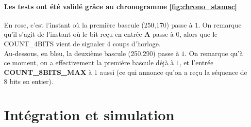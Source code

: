 \documentclass[a4paper]{article} %
\begin{document}
\begin{tcolorbox}[colframe=Monokaimagenta,colback=white]
\begin{figure}[H]
\label{fig:graphe_etat}
\end{figure}


\paragraph{Les tests ont été validé grâce au chronogramme \ref{fig:chrono_stamac}}
En rose, c'est l'instant où la première bascule (250,170) passe à $1$. On remarque qu'il s'agit de l'instant où le bit reçu en entrée \textbf{A} passe à $0$, alors que le COUNT\_4BITS vient de signaler 4 coups d'horloge.\\
Au-dessous, en bleu, la deuxième bascule (250,290) passe à $1$. On remarque qu'à ce moment, on a effectivement la première bascule déjà à $1$, et l'entrée \textbf{COUNT\_8BITS\_MAX} à $1$ aussi (ce qui annonce qu'on a reçu la séquence de 8 bits en entier).
\end{tcolorbox}

\section {Intégration et simulation}
\end{document}
